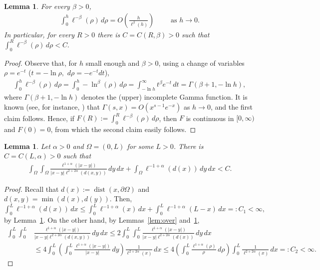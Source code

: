 \documentclass[11 pt]{article}
\newtheorem{lemma}[theorem]{Lemma}
\numberwithin{equation}{section}
\def\dist{\operatorname{dist}}
\begin{document}
\begin{lemma}\label{lem:ellbeta}
For every $\beta>0$,
\begin{align*}
\int_0^h \ell^{-\beta}(\rho)\, d\rho = O\left(\frac{h}{\ell^{\beta}(h)}\right)\qquad \text{ as $h\to 0$.}
\end{align*}
In particular, for every $R>0$ there is $C=C(R,\beta)>0$ such that $\int_0^R \ell^{-\beta}(\rho)\, d\rho<C.$
\end{lemma}
\begin{proof}
Observe that, for $h$ small enough and $\beta>0$, using a change of variables $\rho=e^{-t}$ ($t=-\ln \rho,$ $d\rho=-e^{-t} dt$),
\begin{align*}
\int_0^h \ell^{-\beta}(\rho)\, d\rho
=\int_0^h -\ln^{\beta}(\rho)\, d\rho
=\int_{-\ln h}^\infty t^{\beta}e^{-t}\, dt=\Gamma(\beta+1,-\ln h),
\end{align*}
where $\Gamma(\beta+1,-\ln h)$ denotes the (upper) incomplete Gamma function. It is known (see, for instance, \cite{Tem75}) that $\Gamma(s,x)= O\left(x^{s-1}e^{-x}\right)$ as $h\to 0$, and the first claim follows. Hence, if $F(R):=\int_0^R \ell^{-\beta}(\rho)\, d\rho$, then $F$ is continuous in $[0,\infty)$ and $F(0)=0$, from which the second claim easily follows.
\end{proof}





\begin{lemma}\label{lem:int:bds}
Let $\alpha>0$ and $\Omega=(0,L)$ for some $L>0$. There is $C=C(L,\alpha)>0$ such that 
\begin{align*}
\int_{\Omega}\int_{\Omega}\frac{\ell^{1+\alpha}(|x-y|)}{|x-y|\ell^{2+2\alpha}(d(x,y))}\,dy\, dx+ \int_{\Omega}\ell^{-1+\alpha}(d(x))\, dy\,dx<C.
\end{align*}
\end{lemma}
\begin{proof}
Recall that $d(x):=\dist(x,\partial \Omega)$ and $d(x,y)=\min(d(x),d(y)).$ Then, $\int_0^L \ell^{-1+\alpha}(d(x))\,dx\leq \int_0^L \ell^{-1+\alpha}(x)\,dx+\int_0^L \ell^{-1+\alpha}(L-x)\,dx=:C_1<\infty,$ by Lemma~\ref{lem:ellbeta}. On the other hand, by Lemmas~\ref{lem:over} and~\ref{lem:ellbeta},
\begin{align*}
\int_0^L\int_0^L & \frac{\ell^{1+\alpha}(|x-y|)}{|x-y|\ell^{2+2\alpha}(d(x,y))}\,dy\, dx
\leq 2\int_0^L\int_0^L\frac{\ell^{1+\alpha}(|x-y|)}{|x-y|\ell^{2+2\alpha}(d(x))}\,dy\, dx\\
&\leq 4\int_0^L\left(\int_0^L\frac{\ell^{1+\alpha}(|x-y|)}{|x-y|}\,dy\right)\frac{1}{\ell^{2+2\alpha}(x)}\, dx
\leq 4\left(\int_0^L\frac{\ell^{1+\alpha}(\rho)}{\rho}\,d\rho\right)\int_0^L\frac{1}{\ell^{2+2\alpha}(x)}\, dx=:C_2<\infty.
\end{align*}
\end{proof}
\end{document}
